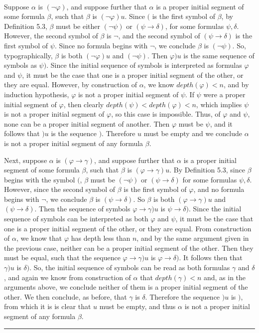 \documentclass[11pt]{hmcpset}
\newenvironment{proof}{\noindent {\bf Proof:} \\}{\hfill
\rule{1mm}{3mm} \bigskip}
\begin{document}
\begin{proof}
Suppose $\alpha$ is $(\lnot\varphi)$, and suppose further that $\alpha$ is a proper initial segment of some formula $\beta$, such that $\beta$ is $(\lnot\varphi)u$. Since $($ is the first symbol of $\beta$, by Definition 5.3, $\beta$ must be either $(\lnot\psi)$ or $(\psi\to\delta)$, for some formulas $\psi,\delta$. However, the second symbol of $\beta$ is $\lnot$, and the second symbol of $(\psi\to\delta)$ is the first symbol of $\psi$. Since no formula begins with $\lnot$, we conclude $\beta$ is $(\lnot\psi)$. So, typographically, $\beta$ is both $(\lnot\varphi)u$ and $(\lnot\psi)$. Then $\varphi)u$ is the same sequence of symbols as $\psi)$. Since the initial sequence of symbols is interpreted as formulas $\varphi$ and $\psi$, it must be the case that one is a proper initial segment of the other, or they are equal. However, by construction of $\alpha$, we know $depth(\varphi) < n$, and by induction hypothesis, $\varphi$ is not a proper initial segment of $\psi$. If $\psi$ were a proper initial segment of $\varphi$, then clearly $depth(\psi) < depth(\varphi) < n$, which implies $\psi$ is not a proper initial segment of $\varphi$, so this case is impossible. Thus, of $\varphi$ and $\psi$, none can be a proper initial segment of another. Then $\varphi$ must be $\psi$, and it follows that $)u$ is the sequence $)$. Therefore $u$ must be empty and we conclude $\alpha$ is not a proper initial segment of any formula $\beta$.

Next, suppose $\alpha$ is $(\varphi\to\gamma)$, and suppose further that $\alpha$ is a proper initial segment of some formula $\beta$, such that $\beta$ is $(\varphi\to\gamma)u$. By Definition 5.3, since $\beta$ begins with the symbol $($, $\beta$ must be $(\lnot\psi)$ or $(\psi\to\delta)$ for some formulas $\psi,\delta$. However, since the second symbol of $\beta$ is the first symbol of $\varphi$, and no formula begins with $\lnot$, we conclude $\beta$ is $(\psi\to\delta)$. So $\beta$ is both $(\varphi\to\gamma)u$ and $(\psi\to\delta)$. Then the sequence of symbols $\varphi\to\gamma)u$ is $\psi\to\delta)$. Since the initial sequence of symbols can be interpreted as both $\varphi$ and $\psi$, it must be the case that one is a proper initial segment of the other, or they are equal. From construction of $\alpha$, we know that $\varphi$ has depth less than $n$,  and by the same argument given in the previous case, neither can be a proper initial segment of the other. Then they must be equal, such that the sequence $\varphi\to\gamma)u$ is $\varphi\to\delta)$. It follows then that $\gamma)u$ is $\delta)$. So, the initial sequence of symbols can be read as both formulas $\gamma$ and $\delta$, and again we know from construction of $\alpha$ that $depth(\gamma) < n$ and, as in the arguments above, we conclude neither of them is a proper initial segment of the other. We then conclude, as before, that $\gamma$ is $\delta$. Therefore the sequence $)u$ is $)$, from which it is is clear that $u$ must be empty, and thus $\alpha$ is not a proper initial segment of any formula $\beta$.


\end{proof}
\end{document}

